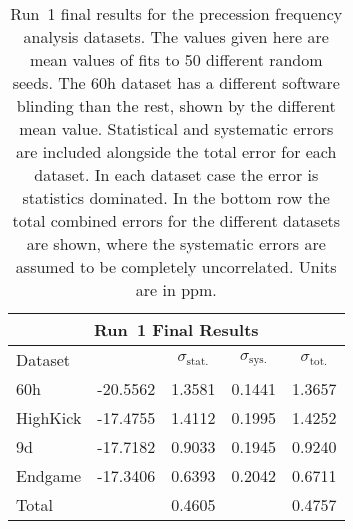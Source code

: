 \begin{table}
\centering
\renewcommand{\arraystretch}{1.2}
\begin{tabular*}{\linewidth}{@{\extracolsep{\fill}}lcccc}
  \hline
    \multicolumn{5}{c}{\textbf{Run~1 Final Results}} \\
  \hline\hline
    Dataset & \multicolumn{1}{c}{\R} & \multicolumn{1}{c}{$\sigma_{\text{stat.}}$} & \multicolumn{1}{c}{$\sigma_{\text{sys.}}$} & \multicolumn{1}{c}{$\sigma_{\text{tot.}}$} \\ 
  \hline
  	60h & -20.5562 & 1.3581 & 0.1441 & 1.3657 \\
  	HighKick & -17.4755 & 1.4112 & 0.1995 & 1.4252 \\
  	9d & -17.7182 & 0.9033 & 0.1945 & 0.9240 \\
  	Endgame & -17.3406 & 0.6393 & 0.2042 & 0.6711 \\
  \hline
  Total & & 0.4605 & & 0.4757 \\
  \hline
\end{tabular*}
\caption[Run~1 final results]{Run~1 final results for the precession frequency analysis datasets. The \R values given here are mean values of fits to 50 different random seeds. The 60h dataset has a different software blinding than the rest, shown by the different mean \R value. Statistical and systematic errors are included alongside the total error for each dataset. In each dataset case the error is statistics dominated. In the bottom row the total combined errors for the different datasets are shown, where the systematic errors are assumed to be completely uncorrelated. Units are in ppm.}
\label{tab:FinalResults}
\end{table}











